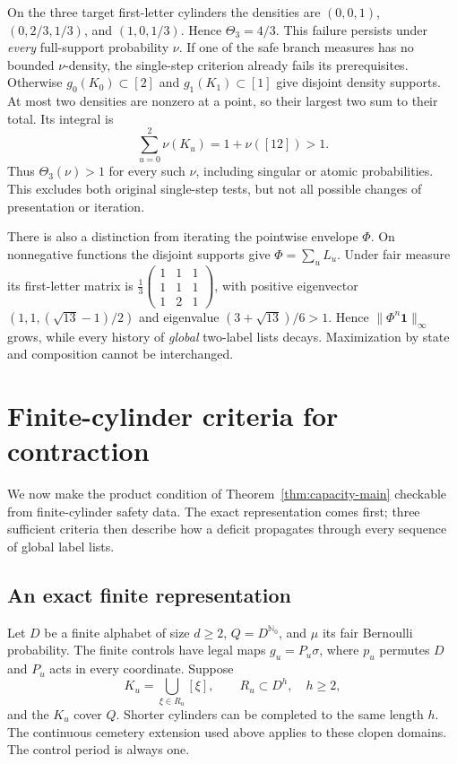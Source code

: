 \documentclass[11pt,reqno]{amsart}
\numberwithin{equation}{section}
\theoremstyle{definition}
\newcommand{\Nzero}{\mathbb N_0}
\newcommand{\one}{\mathbf 1}
\begin{document}
On the three target first-letter cylinders the densities are
$(0,0,1)$, $(0,2/3,1/3)$, and $(1,0,1/3)$.
Hence $\Theta_3=4/3$. This failure persists under \emph{every}
full-support probability $\nu$. If one of the safe branch measures
has no bounded $\nu$-density, the single-step criterion already
fails its prerequisites. Otherwise $g_0(K_0)\subset[2]$ and
$g_1(K_1)\subset[1]$ give disjoint density supports. At most two
densities are nonzero at a point, so their largest two sum to their
total. Its integral is
\[
 \sum_{u=0}^2\nu(K_u)=1+\nu([12])>1.
\]
Thus $\Theta_3(\nu)>1$ for every such $\nu$, including singular
or atomic probabilities. This excludes both original single-step
tests, but not all possible changes of presentation or iteration.

There is also a distinction from iterating the pointwise envelope
$\Phi$. On nonnegative functions the disjoint supports give
$\Phi=\sum_uL_u$. Under fair measure its first-letter matrix is
$\frac13\left(\begin{smallmatrix}1&1&1\\1&1&1\\1&2&1\end{smallmatrix}\right)$,
with positive eigenvector
$(1,1,(\sqrt{13}-1)/2)$ and eigenvalue
$(3+\sqrt{13})/6>1$. Hence $\|\Phi^n\one\|_\infty$ grows,
while every history of \emph{global} two-label lists decays.
Maximization by state and composition cannot be interchanged.


\section{Finite-cylinder criteria for contraction}\label{sec:cylinder}

We now make the product condition of Theorem~\ref{thm:capacity-main}
checkable from finite-cylinder safety data. The exact representation
comes first; three sufficient criteria then describe how a deficit
propagates through every sequence of global label lists.

\subsection{An exact finite representation}
Let $D$ be a finite alphabet of size $d\ge2$, $Q=D^{\Nzero}$,
and $\mu$ its fair Bernoulli probability. The finite controls have
legal maps $g_u=P_u\sigma$, where $p_u$ permutes $D$ and $P_u$
acts in every coordinate. Suppose
\[
 K_u=\bigcup_{\xi\in R_u}[\xi],\qquad R_u\subset D^h,
 \quad h\ge2,
\]
and the $K_u$ cover $Q$. Shorter cylinders can be completed to the
same length $h$. The continuous cemetery extension used above
applies to these clopen domains. The control period is always one.
\end{document}
